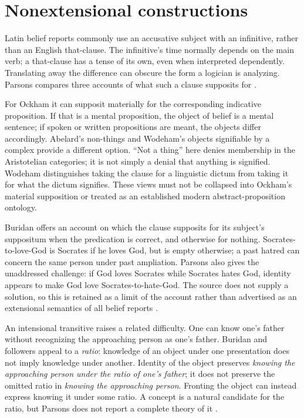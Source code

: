 \section{Nonextensional constructions}
\label{sec:p13-supposition-intensional}

Latin belief reports commonly use an accusative subject with an
infinitive, rather than an English that-clause. The infinitive's time
normally depends on the main verb; a that-clause has a tense of its
own, even when interpreted dependently. Translating away the difference
can obscure the form a logician is analyzing. Parsons compares three
accounts of what such a clause supposits for
\cite[pp.~215--218]{Parsons2007FordhamSupposition}.

For Ockham it can supposit materially for the corresponding indicative
proposition. If that is a mental proposition, the object of belief is
a mental sentence; if spoken or written propositions are meant, the
objects differ accordingly. Abelard's non-things and Wodeham's objects
signifiable by a complex provide a different option. ``Not a thing''
here denies membership in the Aristotelian categories; it is not simply
a denial that anything is signified. Wodeham distinguishes taking the
clause for a linguistic dictum from taking it for what the dictum
signifies. These views must not be collapsed into Ockham's material
supposition or treated as an established modern abstract-proposition
ontology.

Buridan offers an account on which the clause supposits for its subject's
suppositum when the predication is correct, and otherwise for nothing.
Socrates-to-love-God is Socrates if he loves God, but is empty otherwise;
a past hatred can concern the same person under past ampliation. Parsons
also gives the unaddressed challenge: if God loves Socrates while
Socrates hates God, identity appears to make God love Socrates-to-hate-God.
The source does not supply a solution, so this is retained as a limit
of the account rather than advertised as an extensional semantics of
all belief reports \cite[pp.~217--218]{Parsons2007FordhamSupposition}.

An intensional transitive raises a related difficulty. One can know
one's father without recognizing the approaching person as one's father.
Buridan and followers appeal to a \emph{ratio}: knowledge of an object
under one presentation does not imply knowledge under another. Identity
of the object preserves \emph{knowing the approaching person under the
ratio of one's father}; it does not preserve the omitted ratio in
\emph{knowing the approaching person}. Fronting the object can instead
express knowing it under some ratio. A concept is a natural candidate
for the ratio, but Parsons does not report a complete theory of it
\cite[pp.~218--219]{Parsons2007FordhamSupposition}.


